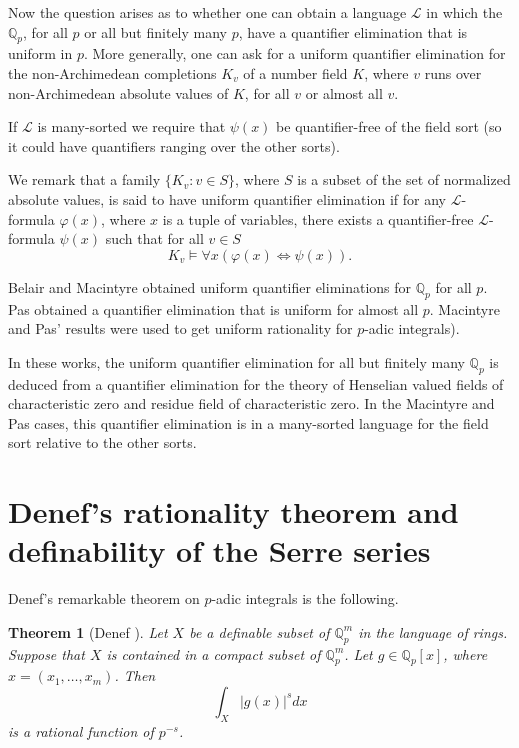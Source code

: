 \documentclass[12pt]{amsart}
\def\cL{\mathcal{L}}
\def\Q{\mathbb{Q}}
\def\cL{\mathcal{L}}
\newtheorem{thm}{Theorem}[section]
\numberwithin{equation}{section}
\begin{document}
Now the question arises as to whether one can obtain a language $\cL$ in which the $\Q_p$, for all $p$ or all but finitely many $p$, have a quantifier elimination that is uniform in $p$. More generally, one can ask for a uniform quantifier elimination for 
the non-Archimedean completions $K_v$ of a number field $K$, 
where $v$ runs over non-Archimedean absolute values of $K$, for all $v$ or almost all $v$. 

If $\cL$ is many-sorted we require that $\psi(x)$ be quantifier-free of the field sort (so it could have quantifiers 
ranging over the other sorts).

We remark that a family $\{K_v: v\in S\}$, where $S$ is a subset of the set of normalized absolute values, is said to have uniform quantifier elimination if for any $\cL$-formula $\varphi(x)$, where $x$ is a tuple of variables, there exists a quantifier-free $\cL$-formula $\psi(x)$ such that for all $v\in S$ 
$$K_v \models \forall x (\varphi(x) \Leftrightarrow \psi(x)).$$

Belair \cite{Belair} and Macintyre \cite{Macintyre2} obtained uniform quantifier eliminations for $\Q_p$ for all $p$. Pas \cite{pas} obtained a quantifier elimination that is uniform for almost all $p$. Macintyre and Pas' results were used to get uniform rationality for $p$-adic integrals).

In these works, the uniform quantifier elimination for all but finitely many $\Q_p$ is deduced from a 
quantifier elimination for the theory of Henselian valued fields of characteristic zero and residue field of characteristic zero. In the Macintyre and Pas cases, this quantifier elimination is in a many-sorted language for the field sort relative to the other sorts.

\section{\bf Denef's rationality theorem and definability of the Serre series}\label{serre}

Denef's remarkable theorem on $p$-adic integrals is the following.

\begin{thm}[Denef \cite{Denefrationality}]\label{denef-thm2} Let $X$ be a definable subset of $\Q_p^m$ in the language of rings. Suppose that $X$ is contained in a compact subset of $\Q_p^m$. Let $g\in \Q_p[x]$, where $x=(x_1,\dots,x_m)$. Then
$$\int_X |g(x)|^s dx$$
is a rational function of $p^{-s}$.\end{thm}
\end{document}
